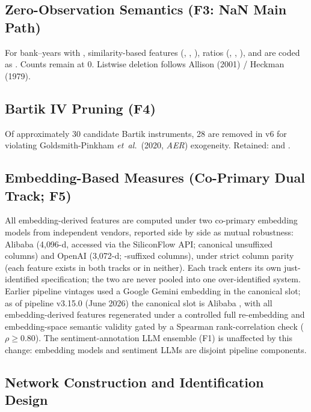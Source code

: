 \subsection{Zero-Observation Semantics (F3: NaN Main Path)}
For bank--years with , similarity-based features
(, , ),
ratios (, ,
), and  are coded
as . Counts remain at 0. Listwise deletion follows Allison
(2001) / Heckman (1979).

\subsection{Bartik IV Pruning (F4)}
Of approximately 30 candidate Bartik instruments, 28 are removed in v6
for violating Goldsmith-Pinkham \emph{et~al.}\ (2020, \emph{AER})
exogeneity. Retained:  and
.

\subsection{Embedding-Based Measures (Co-Primary Dual Track; F5)}
All embedding-derived features are computed under two co-primary
embedding models from independent vendors, reported side by side as
mutual robustness: Alibaba  (4{,}096-d,
accessed via the SiliconFlow API; canonical unsuffixed columns) and
OpenAI  (3{,}072-d; -suffixed
columns), under strict column parity (each feature exists in both
tracks or in neither). Each track enters its own just-identified
specification; the two are never pooled into one over-identified
system. Earlier pipeline vintages used a Google Gemini embedding in
the canonical slot; as of pipeline v3.15.0 (June 2026) the canonical
slot is Alibaba , with all embedding-derived
features regenerated under a controlled full re-embedding and
embedding-space semantic validity gated by a Spearman
rank-correlation check ($\rho \geq 0.80$). The sentiment-annotation
LLM ensemble (F1) is unaffected by this change: embedding models and
sentiment LLMs are disjoint pipeline components.

\subsection{Network Construction and Identification Design}\label{subsec:network}

